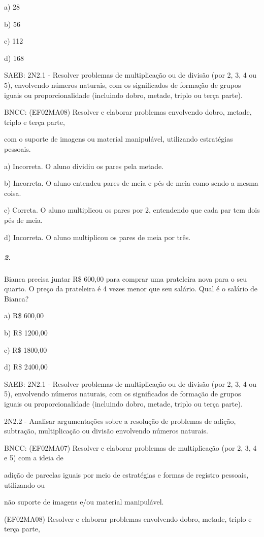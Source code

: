 a) 28

b) 56

c) 112

d) 168

SAEB: 2N2.1 - Resolver problemas de multiplicação ou de divisão (por 2,
3, 4 ou 5), envolvendo números naturais, com os significados de formação
de grupos iguais ou proporcionalidade (incluindo dobro, metade, triplo
ou terça parte).

BNCC: (EF02MA08) Resolver e elaborar problemas envolvendo dobro, metade,
triplo e terça parte,

com o suporte de imagens ou material manipulável, utilizando estratégias
pessoais.

a) Incorreta. O aluno dividiu os pares pela metade.

b) Incorreta. O aluno entendeu pares de meia e pés de meia como sendo a
mesma coisa.

c) Correta. O aluno multiplicou os pares por 2, entendendo que cada par
tem dois pés de meia.

d) Incorreta. O aluno multiplicou os pares de meia por três.

\subparagraph{2.}\label{section-98}

Bianca precisa juntar R\$ 600,00 para comprar uma prateleira nova para o
seu quarto. O preço da prateleira é 4 vezes menor que seu salário. Qual
é o salário de Bianca?

a) R\$ 600,00

b) R\$ 1200,00

c) R\$ 1800,00

d) R\$ 2400,00

SAEB: 2N2.1 - Resolver problemas de multiplicação ou de divisão (por 2,
3, 4 ou 5), envolvendo números naturais, com os significados de formação
de grupos iguais ou proporcionalidade (incluindo dobro, metade, triplo
ou terça parte).

2N2.2 - Analisar argumentações sobre a resolução de problemas de adição,
subtração, multiplicação ou divisão envolvendo números naturais.

BNCC: (EF02MA07) Resolver e elaborar problemas de multiplicação (por 2,
3, 4 e 5) com a ideia de

adição de parcelas iguais por meio de estratégias e formas de registro
pessoais, utilizando ou

não suporte de imagens e/ou material manipulável.

(EF02MA08) Resolver e elaborar problemas envolvendo dobro, metade,
triplo e terça parte,


